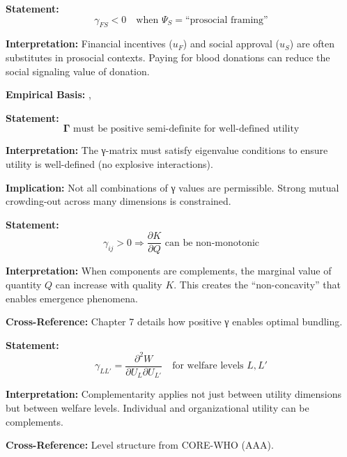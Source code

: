 \begin{tcolorbox}[colback=gray!5!white, colframe=gray!75!black,
    title=Axiom CMP-6: Social-Financial Tension]
\textbf{Statement:}
\begin{equation}
\gamma_{FS} < 0 \quad \text{when } \Psi_S = \text{``prosocial framing''}
\end{equation}

\textbf{Interpretation:} Financial incentives ($u_F$) and social approval ($u_S$)
are often substitutes in prosocial contexts. Paying for blood donations can reduce
the social signaling value of donation.

\textbf{Empirical Basis:} \citet{gneezy2011pay}, \citet{ariely2009doing}
\end{tcolorbox}

\begin{tcolorbox}[colback=gray!5!white, colframe=gray!75!black,
    title=Axiom CMP-7: Positive Definiteness Requirement]
\textbf{Statement:}
\begin{equation}
\mathbf{\Gamma} \text{ must be positive semi-definite for well-defined utility}
\end{equation}

\textbf{Interpretation:} The γ-matrix must satisfy eigenvalue conditions to ensure
utility is well-defined (no explosive interactions).

\textbf{Implication:} Not all combinations of γ values are permissible.
Strong mutual crowding-out across many dimensions is constrained.
\end{tcolorbox}

\begin{tcolorbox}[colback=gray!5!white, colframe=gray!75!black,
    title=Axiom CMP-8: Emergence from Complementarity]
\textbf{Statement:}
\begin{equation}
\gamma_{ij} > 0 \Rightarrow \frac{\partial K}{\partial Q} \text{ can be non-monotonic}
\end{equation}

\textbf{Interpretation:} When components are complements, the marginal value of
quantity $Q$ can increase with quality $K$. This creates the ``non-concavity''
that enables emergence phenomena.

\textbf{Cross-Reference:} Chapter 7 details how positive γ enables optimal bundling.
\end{tcolorbox}

\begin{tcolorbox}[colback=gray!5!white, colframe=gray!75!black,
    title=Axiom CMP-9: Level-Level Complementarity]
\textbf{Statement:}
\begin{equation}
\gamma_{LL'} = \frac{\partial^2 W}{\partial U_L \partial U_{L'}} \quad \text{for welfare levels } L, L'
\end{equation}

\textbf{Interpretation:} Complementarity applies not just between utility dimensions
but between welfare levels. Individual and organizational utility can be complements.

\textbf{Cross-Reference:} Level structure from CORE-WHO (AAA).
\end{tcolorbox}

